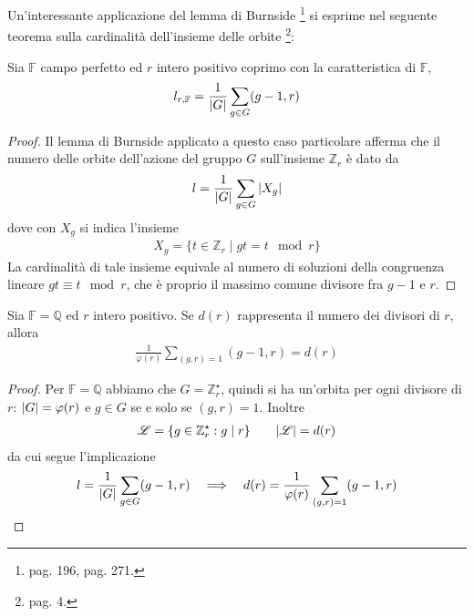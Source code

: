 Un'interessante applicazione del lemma di Burnside
\footnote{\cite{artin} pag. 196, \cite{cattaneo} pag. 271. }
si esprime nel seguente teorema sulla cardinalità dell'insieme delle orbite
\footnote{\cite{cerruti} pag. 4. }:
\begin{teorema}
Sia $\mathbb{F}$ campo perfetto ed $r$ intero positivo coprimo con la caratteristica di $\mathbb{F}$,
\begin{align*}
   l_{r,\mathbb{F}} = \frac{1}{\arrowvert G \arrowvert }\sum_{g \in G} (g-1, r) 
\end{align*}
\end{teorema}
\begin{proof}
Il lemma di Burnside applicato a questo caso particolare afferma che il numero delle orbite dell'azione del gruppo $G$ sull'insieme $ \mathbb{Z}_{r}$ è dato da 
\begin{align*}
   l = \frac{1}{\arrowvert G \arrowvert }\sum_{g \in G}\arrowvert X_{g} \arrowvert
\end{align*}
dove con $X_{g}$ si indica l'insieme
\begin{align*}
   X_{g} = \lbrace t \in \mathbb{Z}_{r} \mid gt = t \mod r \rbrace 
\end{align*}
La cardinalità di tale insieme equivale al numero di soluzioni della congruenza lineare $ gt \equiv t \mod{r}$, che è proprio il massimo comune divisore fra $g-1$ e $r$.
\end{proof}

\begin{corollario}
Sia $\mathbb{F}= \mathbb{Q}$ ed $r$ intero positivo. Se $d(r)$ rappresenta il numero dei divisori di $r$, allora
\begin{align*}
   \frac{1}{\varphi(r) }\sum_{(g,r) = 1} (g-1, r) = d(r) 
\end{align*}
\end{corollario}
\begin{proof}
Per $\mathbb{F}= \mathbb{Q}$ abbiamo che $G =\mathbb{Z}_{r}^{\star}$, quindi si ha un'orbita per ogni divisore di $r$: $\arrowvert G \arrowvert = \varphi(r)$ e $g \in G$ se e solo se $(g,r) = 1$. Inoltre 
\begin{align*}
   \mathscr{L} = \lbrace g \in \mathbb{Z}_{r}^{\star} : g\mid r \rbrace
   \qquad 
   \arrowvert  \mathscr{L} \arrowvert = d(r)
\end{align*}
da cui segue l'implicazione
\begin{align*}
   l = \frac{1}{\arrowvert G \arrowvert }\sum_{g \in G} (g-1, r) 
   \quad
   \Longrightarrow
   \quad
   d(r) = \frac{1}{\varphi(r) }\sum_{(g,r) = 1} (g-1, r) 
\end{align*}
\end{proof}

